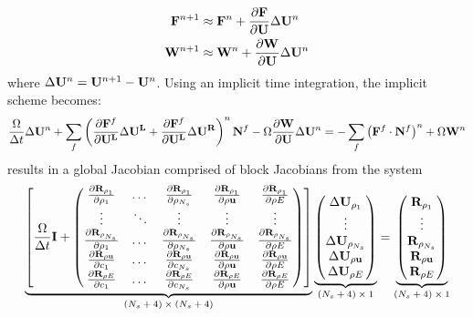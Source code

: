 \begin{align}
  \mathbf F^{n+1} &\approx \mathbf F^n + \frac{\partial \mathbf F}{\partial \mathbf U} \Delta \mathbf U^n \\
  \mathbf W^{n+1} &\approx \mathbf W^n + \frac{\partial \mathbf W}{\partial \mathbf U} \Delta \mathbf U^n
  \label{fc-fluxes-timelevel}
\end{align}
where $\Delta \mathbf U^n = \mathbf U^{n+1} - \mathbf U^{n}$.  Using an implicit time integration,
the implicit scheme becomes:
\begin{equation}
	  \frac{\Omega}{\Delta t} \Delta \mathbf U^n
    +\sum\limits_{f}^{}{
      \left(\frac{\partial \mathbf F^f}{\partial \mathbf{U^L}} \Delta \mathbf{U^L} + \frac{\partial \mathbf F^f}{\partial \mathbf{U^L}} \Delta \mathbf{U^R} \right)^n 
      \mathbf{N}^f
    } - \Omega \frac{\partial \mathbf W}{\partial \mathbf U}
  \Delta \mathbf U^n
  = - \sum\limits_{f}^{}{\left( \mathbf F^f \cdot \mathbf{N}^f \right)^n} + \Omega \mathbf W^n
  \label{fc-explicit}
\end{equation}
 results in a global Jacobian comprised of block Jacobians
from the system
\begin{equation}
  \underbrace{
    \left[ 
      \frac{\Omega}{\Delta t} \mathbf I + 
      \begin{pmatrix}
        \frac{\partial \mathbf R_{\rho_1}}{\partial \rho_1}     & \dots  & \frac{\partial \mathbf R_{\rho_1}}{\partial \rho_{N_s}}     & \frac{\partial \mathbf R_{\rho_1}}{\partial \rho \mathbf u}     & \frac{\partial \mathbf R_{\rho_1}}{\partial \rho E}      \\
        \vdots                     & \ddots & \vdots                         & \vdots                       & \vdots                      \\
        \frac{\partial \mathbf R_{\rho_{N_s}}}{\partial \rho_1} & \dots  & \frac{\partial \mathbf R_{\rho_{N_s}}}{\partial \rho_{N_s}} & \frac{\partial \mathbf R_{\rho_{N_s}}}{\partial \rho \mathbf u} &  \frac{\partial \mathbf R_{\rho_{N_s}}}{\partial \rho E} \\
        \frac{\partial \mathbf R_{\rho \mathbf u}}{\partial c_1}      & \dots  & \frac{\partial \mathbf R_{\rho \mathbf u}}{\partial c_{N_s}}      & \frac{\partial \mathbf R_{\rho \mathbf u}}{\partial \rho \mathbf u}   &  \frac{\partial \mathbf R_{\rho \mathbf u}}{\partial \rho E}   \\
        \frac{\partial \mathbf R_{\rho E}}{\partial c_1}        & \dots  & \frac{\partial \mathbf R_{\rho E}}{\partial c_{N_s}}        & \frac{\partial \mathbf R_{\rho E}}{\partial \rho \mathbf u}     &  \frac{\partial \mathbf R_{\rho E}}{\partial \rho E}
      \end{pmatrix}
    \right]
  }_\text{$(N_s + 4) \times (N_s + 4)$}
  \underbrace{
    \begin{pmatrix}
      \Delta \mathbf U_{\rho_1}     \\
      \vdots          \\
      \Delta \mathbf U_{\rho_{N_s}} \\
      \Delta \mathbf U_{\rho \mathbf u}   \\
      \Delta \mathbf U_{\rho E}
    \end{pmatrix}
  }_\text{$(N_s + 4) \times 1$}
  =
  \underbrace{
    \begin{pmatrix}
      \mathbf R_{\rho_1}     \\
      \vdots           \\
      \mathbf R_{\rho_{N_s}} \\
      \mathbf R_{\rho \mathbf u}   \\
      \mathbf R_{\rho E}
    \end{pmatrix}
  }_\text{$(N_s + 4) \times 1$}
  \label{drdu-fc-flow}
\end{equation}
